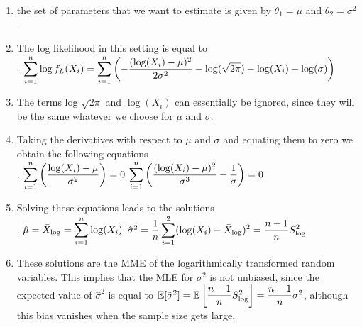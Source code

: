\begin{enumerate}
    \item the set of parameters that we want to estimate is given by $\theta_1 = \mu$ and $\theta_2 = \sigma^ 2 $.
    \hfill \cite{statistics/book/Statistics-for-Data-Scientists/Maurits-Kaptein}

    \item The log likelihood in this setting is equal to
    \hfill \cite{statistics/book/Statistics-for-Data-Scientists/Maurits-Kaptein}
    \\
    .\hfill
    $
        \displaystyle\sum ^n _{i=1} \log f _L (X_i )
        = \displaystyle\sum ^n _{i=1} \left(
            - \dfrac{(\log (X_i ) - \mu)^2} {2\sigma^2}
            - \log (\sqrt{2\pi})
            - \log(X_i )
            - \log (\sigma )
        \right)
    $
    \hfill \cite{statistics/book/Statistics-for-Data-Scientists/Maurits-Kaptein}

    \item The terms log $\sqrt{2\pi}$ and $\log(X_i )$ can essentially be ignored, since they will be the same whatever we choose for $\mu$ and $\sigma$.
    \hfill \cite{statistics/book/Statistics-for-Data-Scientists/Maurits-Kaptein}

    \item Taking the derivatives with respect to $\mu$ and $\sigma$ and equating them to zero we obtain the following equations
    \hfill \cite{statistics/book/Statistics-for-Data-Scientists/Maurits-Kaptein}
    \\
    .\hfill
    $
        \displaystyle\sum^n_{i=1} \left( \dfrac{\log(X_i ) - \mu }{\sigma^ 2} \right) = 0
    $
    \hfill
    $
        \displaystyle\sum ^n _{i=1} \left( \dfrac{(\log (X_i) - \mu)^2 }{\sigma^3} - \dfrac{1}{ \sigma}\right) = 0
    $
    \hfill \cite{statistics/book/Statistics-for-Data-Scientists/Maurits-Kaptein}

    \item Solving these equations leads to the solutions
    \hfill \cite{statistics/book/Statistics-for-Data-Scientists/Maurits-Kaptein}
    \\
    .\hfill
    $\hat{\mu} = \bar{X}_{\log} = \displaystyle\sum ^n _{i=1} \log(X_i ) $
    \hfill
    $
        \hat{\sigma}^ 2
        = \dfrac{1}{n} \displaystyle\sum^2 _{i=1}(\log(X_i ) - \bar{X}_{\log})^2
        = \dfrac{n - 1}{n}S^2_{ \log}
    $
    \hfill \cite{statistics/book/Statistics-for-Data-Scientists/Maurits-Kaptein}

    \item These solutions are the MME of the logarithmically transformed random variables.
    This implies that the MLE for $\sigma^  2$ is not unbiased, since the expected value of $\hat{\sigma}^2$ is equal to $\mathbb{E}[\hat{\sigma}^2] = \mathbb{E}\left[\dfrac{n - 1}{n} S^2 _{\log}\right] = \dfrac{n - 1}{n} \sigma^2$, although this bias vanishes when the sample size gets large.
    \hfill \cite{statistics/book/Statistics-for-Data-Scientists/Maurits-Kaptein}


\end{enumerate}
